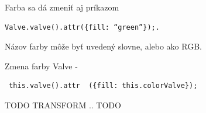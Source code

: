 Farba sa dá zmeniť aj príkazom 

\begin{verbatim}
Valve.valve().attr({fill: “green”});.
\end{verbatim}

Názov farby môže byť uvedený slovne, alebo ako RGB. 

Zmena farby Valve - \begin{verbatim} this.valve().attr  ({fill: this.colorValve}); \end{verbatim}


TODO TRANSFORM .. TODO